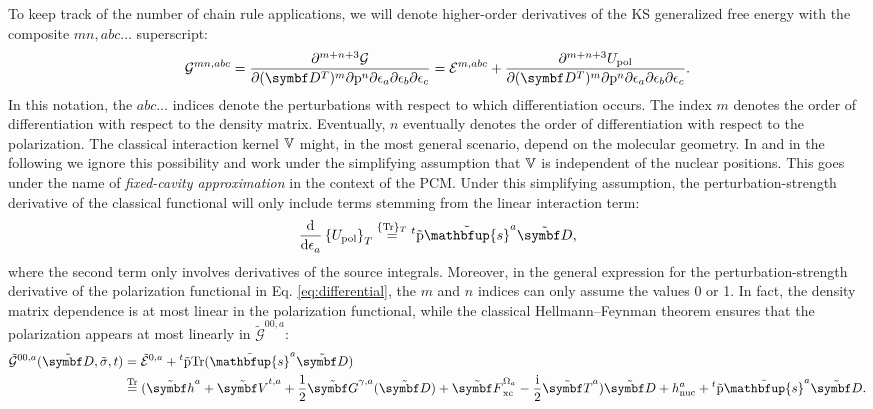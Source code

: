 To keep track of the number of chain rule applications,
we will denote higher-order derivatives of the \acrshort*{KS}
generalized free energy with the composite ${mn, abc\ldots}$
superscript:
\begin{equation}\label{eq:differential}
  \mathcal{G}^{mn, abc}
  =
  \frac{\partial^{m+n+3}\mathcal{G}}{\partial(\mat{D}^T)^m\partial\p^n\partial\epsilon_a\partial\epsilon_b\partial\epsilon_c}
  =
    \mathcal{E}^{m, abc} +
  \frac{\partial^{m+n+3}U_\mathrm{pol}}{\partial(\mat{D}^T)^m\partial\p^n\partial\epsilon_a\partial\epsilon_b\partial\epsilon_c} \text{.}
\end{equation}
In this notation, the $abc\ldots$ indices denote the perturbations with
respect to which differentiation occurs. The index $m$ denotes the order
of differentiation with respect to the density matrix. Eventually, $n$
eventually denotes the order of differentiation with respect to the
polarization.
The classical interaction kernel $\mathbb{V}$ might, in the most general
scenario, depend on the molecular geometry.
In  and in the following we ignore this possibility and work
under the simplifying assumption that $\mathbb{V}$ is independent of the nuclear
positions.
This goes under the name of \emph{fixed-cavity approximation} in the
context of the \acrshort*{PCM}.\autocite{Cammi1994-qj}
Under this simplifying assumption, the perturbation-strength derivative
of the classical functional will only include terms stemming from the
linear interaction term:
\begin{equation}\label{eq:polarization-derivative}
 \deriv{}{\epsilon_a}\left\lbrace
 U_\mathrm{pol}
 \right\rbrace_T
 \eqavetr
 {}^t\tilde{\p}\tilde{\mathbfup{s}}^a\pertmat{D} \text{,}
\end{equation}
where the second term only involves derivatives of the source integrals.
Moreover, in the general expression for the perturbation-strength
derivative of the polarization functional in Eq. \eqref{eq:differential},
the $m$ and $n$ indices can only assume the values 0 or 1.
In fact, the density matrix dependence is at most linear in the
polarization functional, while the classical Hellmann--Feynman theorem
ensures that the polarization appears at most linearly in $\tilde{\mathcal{G}}^{00,a}$:
\begin{equation}\label{eq:tilde-G00-a}
  \begin{aligned}
    \tilde{\mathcal{G}}^{00,a}(\tilde{\mat{D}}, \tilde{\sigma}, t)
    &= \tilde{\mathcal{E}}^{0,a} +
    {}^t\tilde{\p}\Tr({\tilde{\mathbfup{s}}^a\pertmat{D}}) \\
  &\eqtr
  (\pertmat{h}^a + \pertmat{V}^{t,a} + \frac{1}{2}\pertmat{G}^{\gamma, a}(\pertmat{D}) + \pertmat{F}^{\Omega_a}_\mathrm{xc}
  -\frac{\mathrm{i}}{2}\pertmat{T}^a)\pertmat{D}
  + h_\mathrm{nuc}^a + {}^t\tilde{\p}\tilde{\mathbfup{s}}^a\pertmat{D}.
  \end{aligned}
\end{equation}
